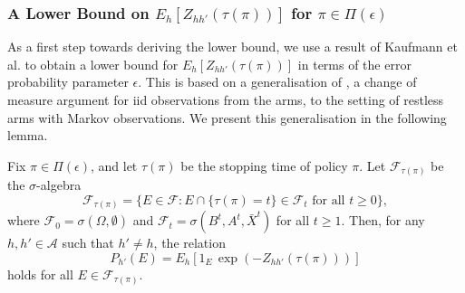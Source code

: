 \subsubsection{A Lower Bound on $E_h[Z_{hh'}(\tau(\pi))]$ for $\pi\in\Pi(\epsilon)$}
As a first step towards deriving the lower bound, we use a result of Kaufmann et al. \cite{Kaufmann2016} to obtain a lower bound for $E_h[Z_{hh'}(\tau(\pi))]$ in terms of the error probability parameter $\epsilon$. This is based on a generalisation of \cite[Lemma 18]{Kaufmann2016}, a change of measure argument for iid observations from the arms, to the setting of restless arms with Markov observations. We present this generalisation in the following lemma. 

\begin{lemma}\label{restless_with_known_lem:change_of_measure}
	Fix $\pi\in\Pi(\epsilon)$, and let $\tau(\pi)$ be the stopping time of policy $\pi$. Let $\mathcal{F}_{\tau(\pi)}$ be the $\sigma$-algebra
	\begin{equation}
		\mathcal{F}_{\tau(\pi)}=\{E\in\mathcal{F}:E\cap \{\tau(\pi)= t\}\in\mathcal{F}_t\text{ for all }t\geq 0\},\label{restless_with_known_eq:F_tau}
	\end{equation}
	where $\mathcal{F}_0=\sigma(\Omega, \emptyset)$ and $\mathcal{F}_t=\sigma(B^t,A^t,\bar{X}^t)$ for all $t\geq 1$. Then, for any $h,h'\in\mathcal{A}$ such that $h'\neq h$, the relation 
	\begin{equation}
		P_{h'}(E)=E_h[1_{E}\,\exp(-Z_{hh'}(\tau(\pi)))]\label{restless_with_known_eq:change_of_measure}
	\end{equation}
	holds for all $E\in\mathcal{F}_{\tau(\pi)}$.
\end{lemma}

